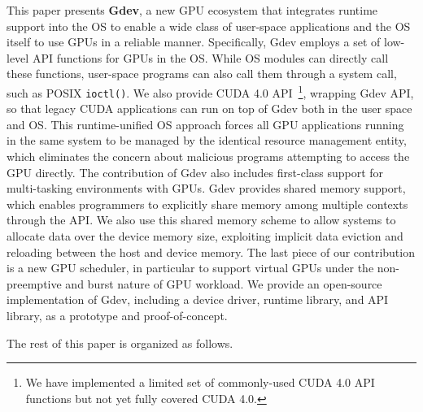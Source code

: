 This paper presents \textbf{Gdev}, a new GPU ecosystem that integrates
runtime support into the OS to enable a wide class of user-space
applications and the OS itself to use GPUs in a reliable manner.
Specifically, Gdev employs a set of low-level API functions for GPUs
in the OS.
While OS modules can directly call these functions, user-space
programs can also call them through a system call, such as POSIX
\texttt{ioctl()}.
We also provide CUDA 4.0 API~\cite{CUDA40}\footnote{We have
implemented a limited set of commonly-used CUDA 4.0 API functions but
not yet fully covered CUDA 4.0.}, wrapping Gdev API, so that legacy CUDA
applications can run on top of Gdev both in the user space and OS.
This runtime-unified OS approach forces all GPU applications running in
the same system to be managed by the identical resource management
entity, which eliminates the concern about malicious programs attempting
to access the GPU directly.
The contribution of Gdev also includes first-class support for
multi-tasking environments with GPUs.
Gdev provides shared memory support, which enables programmers to
explicitly share memory among multiple contexts through the API.
We also use this shared memory scheme to allow systems to
allocate data over the device memory size, exploiting implicit data
eviction and reloading between the host and device memory.
The last piece of our contribution is a new GPU scheduler, in particular
to support virtual GPUs under the non-preemptive and burst nature of GPU
workload.
We provide an open-source implementation of Gdev, including a device
driver, runtime library, and API library, as a prototype and
proof-of-concept.

The rest of this paper is organized as follows.